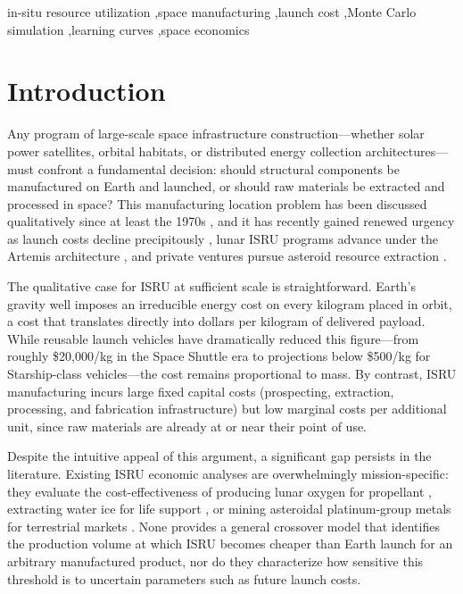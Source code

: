 \documentclass[preprint,12pt]{elsarticle}
\begin{document}
\begin{frontmatter}
\begin{keyword}
in-situ resource utilization \sep space manufacturing \sep launch cost \sep Monte Carlo simulation \sep learning curves \sep space economics
\end{keyword}

\end{frontmatter}

\linenumbers

\section{Introduction}
\label{sec:introduction}

Any program of large-scale space infrastructure construction---whether solar power satellites, orbital habitats, or distributed energy collection architectures---must confront a fundamental decision: should structural components be manufactured on Earth and launched, or should raw materials be extracted and processed in space? This manufacturing location problem has been discussed qualitatively since at least the 1970s \cite{oneill1976,oneill1977}, and it has recently gained renewed urgency as launch costs decline precipitously \cite{jones2018}, lunar ISRU programs advance under the Artemis architecture \cite{sanders2015}, and private ventures pursue asteroid resource extraction \cite{elvis2012,andrews2015}.

The qualitative case for ISRU at sufficient scale is straightforward. Earth's gravity well imposes an irreducible energy cost on every kilogram placed in orbit, a cost that translates directly into dollars per kilogram of delivered payload. While reusable launch vehicles have dramatically reduced this figure---from roughly \$20{,}000/kg in the Space Shuttle era to projections below \$500/kg for Starship-class vehicles---the cost remains proportional to mass. By contrast, ISRU manufacturing incurs large fixed capital costs (prospecting, extraction, processing, and fabrication infrastructure) but low marginal costs per additional unit, since raw materials are already at or near their point of use.

Despite the intuitive appeal of this argument, a significant gap persists in the literature. Existing ISRU economic analyses are overwhelmingly mission-specific: they evaluate the cost-effectiveness of producing lunar oxygen for propellant \cite{sanders2015}, extracting water ice for life support \cite{zubrin1996}, or mining asteroidal platinum-group metals for terrestrial markets \cite{sonter1997,elvis2012}. None provides a general crossover model that identifies the production volume at which ISRU becomes cheaper than Earth launch for an arbitrary manufactured product, nor do they characterize how sensitive this threshold is to uncertain parameters such as future launch costs.
\end{document}
